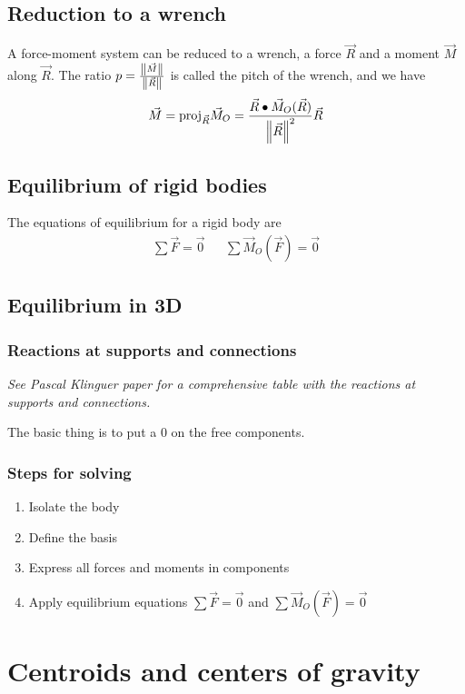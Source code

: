 \documentclass[10pt, twocolumn]{article}
\begin{document}
\subsection{Reduction to a wrench}
A force-moment system can be reduced to a wrench, a force \(\vec{R}\) and a moment \(\vec{M}\) along \(\vec{R}\).
The ratio \(p = \frac{\left\| \vec{M} \right\|}{\left\| \vec{R} \right\|}\) is called the pitch of the wrench, and we have
\[
  \vec{M} = \mathrm{proj}_{\vec{R}}\vec{M}_O = \frac{\vec{R} \bullet \vec{M}_O(\vec{R})}{\left\| \vec{R} \right\|^2}\vec{R}
\]

\subsection{Equilibrium of rigid bodies}
The equations of equilibrium for a rigid body are
\begin{align*}
  \sum{\vec{F}} = \vec{0} &  & \sum{\vec{M}_O(\vec{F})} = \vec{0}
\end{align*}

\subsection{Equilibrium in 3D}
\subsubsection{Reactions at supports and connections}
\emph{See Pascal Klinguer paper for a comprehensive table with the reactions at supports and connections.}

The basic thing is to put a 0 on the free components.

\subsubsection{Steps for solving}
\begin{enumerate}
  \item Isolate the body
  \item Define the basis
  \item Express all forces and moments in components
  \item Apply equilibrium equations \(\sum{\vec{F}} = \vec{0}\) and \(\sum{\vec{M}_O(\vec{F})} = \vec{0}\)
\end{enumerate}

\section{Centroids and centers of gravity}
\end{document}
